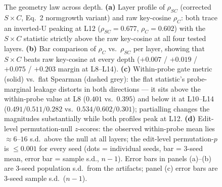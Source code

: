 \begin{figure}[t]
\centering

\caption{The geometry law across depth.
\textbf{(a)} Layer profile of $\rho_{SC}$ (corrected $S{\times}C$, Eq.~2
normgrowth variant) and raw key-cosine $\rho_C$: both trace an inverted-U
peaking at L12 ($\rho_{SC}=0.677$, $\rho_C=0.602$) with the
$S{\times}C$ statistic strictly above the raw key-cosine at all four
tested layers.
\textbf{(b)} Bar comparison of $\rho_C$ vs.\ $\rho_{SC}$ per layer, showing
that $S{\times}C$ beats raw key-cosine at every depth
($+0.007$ / $+0.019$ / $+0.075$ / $+0.203$ margin at L8--L14).
\textbf{(c)} Within-probe gate metric (solid) vs.\ flat Spearman (dashed
grey): the flat statistic's probe-marginal leakage distorts in both
directions --- it sits above the within-probe value at L8
($0.401$ vs.\ $0.395$) and below it at L10--L14
($0.491/0.511/0.282$ vs.\ $0.534/0.602/0.301$); partialling changes the
magnitudes substantially while both profiles peak at L12.
\textbf{(d)} Edit-level permutation-null $z$-scores: the observed within-probe
mean lies ${\approx}6$--$16$ s.d.\ above the null at all layers; the
edit-level permutation-$p$ is $\leq 0.001$ for every seed (dots =
individual seeds, bar = 3-seed mean, error bar = sample s.d., $n{-}1$).
Error bars in panels (a)--(b) are 3-seed population s.d.\ from the
artifacts; panel (c) error bars are 3-seed sample s.d.\ ($n{-}1$).}
\label{fig:geometry_law}
\end{figure}
